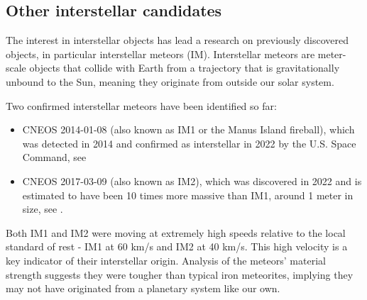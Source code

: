 \subsection{Other interstellar candidates}

The interest in interstellar objects has lead a research on previously
discovered objects, in particular interstellar meteors (IM). Interstellar
meteors are meter-scale objects that collide with Earth from a trajectory that
is gravitationally unbound to the Sun, meaning they originate from outside our
solar system.

Two confirmed interstellar meteors have been identified so far:

\begin{itemize}
  \item CNEOS 2014-01-08 (also known as IM1 or the Manus Island fireball), which
        was detected in 2014 and confirmed as interstellar in 2022 by the U.S. Space
        Command, see \cite{siraj2022}
  \item CNEOS 2017-03-09 (also known as IM2), which was discovered in 2022 and is
        estimated to have been 10 times more massive than IM1, around 1 meter in
        size, see \cite{eloy2022characterizatioa}.
\end{itemize}

Both IM1 and IM2 were moving at extremely high speeds relative to the local
standard of rest - IM1 at 60 km/s and IM2 at 40 km/s. This high velocity is a
key indicator of their interstellar origin. Analysis of the meteors' material
strength suggests they were tougher than typical iron meteorites, implying they
may not have originated from a planetary system like our own.
